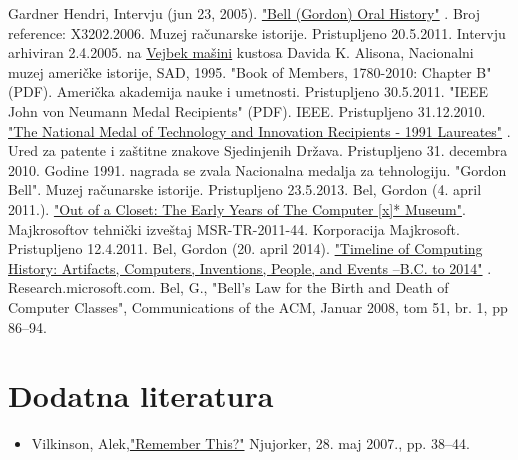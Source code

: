 \documentclass[a4paper]{article}
\begin{document}
{\appendix
\renewcommand{\refname}{Reference}
\begin{thebibliography}{9}
 Gardner Hendri, Intervju (jun 23, 2005). \href{https://computerhistory.org/collections/accession/102702036}{"Bell (Gordon) Oral History"} . Broj reference: X3202.2006. Muzej računarske istorije. Pristupljeno 20.5.2011. 
 Intervju arhiviran 2.4.2005. na \href{https://sr.wikipedia.org/wiki/Wayback_Machine}{Vejbek mašini} kustosa Davida K. Alisona, Nacionalni muzej američke istorije, SAD, 1995.
  "Book of Members, 1780-2010: Chapter B" (PDF). Američka akademija nauke i umetnosti. Pristupljeno 30.5.2011.
 "IEEE John von Neumann Medal Recipients" (PDF). IEEE. Pristupljeno 31.12.2010.
 \href{https://www.uspto.gov/learning-and-resources/ip-programs-and-awards/national-medal-technology-and-innovation-nmti}{ "The National Medal of Technology and Innovation Recipients - 1991 Laureates"} . Ured za patente i zaštitne znakove Sjedinjenih Država. Pristupljeno 31. decembra 2010. Godine 1991. nagrada se zvala Nacionalna medalja za tehnologiju.
 "Gordon Bell". Muzej računarske istorije. Pristupljeno 23.5.2013.
  Bel, Gordon (4. april 2011.). \href{https://www.microsoft.com/en-us/research/publication/out-of-a-closet-the-early-years-of-years-of-the-computer-x-museums/}{"Out of a Closet: The Early Years of The Computer [x]* Museum"}. Majkrosoftov tehnički izveštaj MSR-TR-2011-44. Korporacija Majkrosoft. Pristupljeno 12.4.2011.
 Bel, Gordon (20. april 2014). \href{https://gordonbell.azurewebsites.net/}{"Timeline of Computing History: Artifacts, Computers, Inventions, People, and Events --B.C. to 2014"} . Research.microsoft.com.
  Bel, G., "Bell’s Law for the Birth and Death of Computer Classes", Communications of the ACM, Januar 2008, tom 51, br. 1, pp 86–94. 
 

\end{thebibliography}

\section{Dodatna literatura}
\label{sec:naslov1}
\begin{itemize}
\item Vilkinson, Alek,\href{https://www.newyorker.com/magazine/2007/05/28/remember-this}{"Remember This?"}  Njujorker, 28. maj 2007., pp. 38–44.

\end{itemize} 

}
\end{document}
